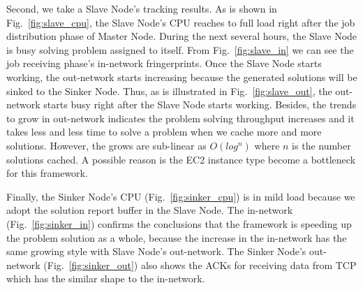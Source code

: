 Second, we take a Slave Node's tracking results. As is shown in Fig.~\ref{fig:slave_cpu}, the Slave Node's CPU reaches to full load right after the job distribution phase of Master Node. During the next several hours, the Slave Node is busy solving problem assigned to itself. From Fig.~\ref{fig:slave_in} we can see the job receiving phase's in-network fringerprints. Once the Slave Node starts working, the out-network starts increasing because the generated solutions will be sinked to the Sinker Node. Thus, as is illustrated in Fig.~\ref{fig:slave_out}, the out-network starts busy right after the Slave Node starts working. Besides, the trends to grow in out-network indicates the problem solving throughput increases and it takes less and less time to solve a problem when we cache more and more solutions. However, the grows are sub-linear as $O(log^n)$ where $n$ is the number solutions cached. A possible reason is the EC2 instance type become a bottleneck for this framework.

Finally, the Sinker Node's CPU (Fig.~\ref{fig:sinker_cpu}) is in mild load because we adopt the solution report buffer in the Slave Node. The in-network (Fig.~\ref{fig:sinker_in}) confirms the conclusions that the framework is speeding up the problem solution as a whole, because the increase in the in-network has the same growing style with Slave Node's out-network. The Sinker Node's out-network (Fig.~\ref{fig:sinker_out}) also shows the ACKs for receiving data from TCP which has the similar shape to the in-network.

